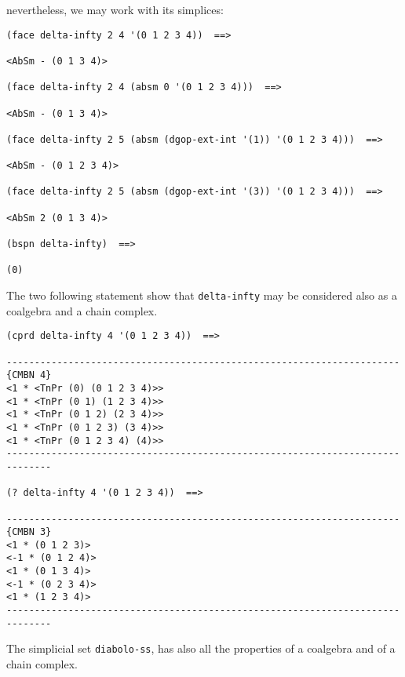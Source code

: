 nevertheless, we may work with its simplices:
{\footnotesize\begin{verbatim}
(face delta-infty 2 4 '(0 1 2 3 4))  ==>

<AbSm - (0 1 3 4)>

(face delta-infty 2 4 (absm 0 '(0 1 2 3 4)))  ==>

<AbSm - (0 1 3 4)>

(face delta-infty 2 5 (absm (dgop-ext-int '(1)) '(0 1 2 3 4)))  ==>

<AbSm - (0 1 2 3 4)>

(face delta-infty 2 5 (absm (dgop-ext-int '(3)) '(0 1 2 3 4)))  ==>

<AbSm 2 (0 1 3 4)>

(bspn delta-infty)  ==>

(0)
\end{verbatim}}
The two following statement show that {\tt delta-infty} may be considered
also as a coalgebra and a chain complex.
{\footnotesize\begin{verbatim}
(cprd delta-infty 4 '(0 1 2 3 4))  ==>

----------------------------------------------------------------------{CMBN 4}
<1 * <TnPr (0) (0 1 2 3 4)>>
<1 * <TnPr (0 1) (1 2 3 4)>>
<1 * <TnPr (0 1 2) (2 3 4)>>
<1 * <TnPr (0 1 2 3) (3 4)>>
<1 * <TnPr (0 1 2 3 4) (4)>>
------------------------------------------------------------------------------

(? delta-infty 4 '(0 1 2 3 4))  ==>

----------------------------------------------------------------------{CMBN 3}
<1 * (0 1 2 3)>
<-1 * (0 1 2 4)>
<1 * (0 1 3 4)>
<-1 * (0 2 3 4)>
<1 * (1 2 3 4)>
------------------------------------------------------------------------------

\end{verbatim}}
The simplicial set {\tt diabolo-ss},  has also all the properties of a coalgebra and
of a chain complex.
